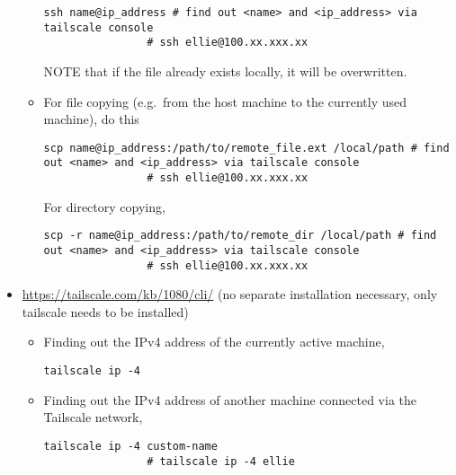 \documentclass[12pt, a4paper]{scrbook}
\numberwithin{equation}{section}
\theoremstyle{definition}
\theoremstyle{definition}
\begin{document}
\begin{itemize}
\begin{itemize}
			\begin{lstlisting}[style=mystylepython, label=alg:tailscale_connec, xleftmargin=\parindent]
				ssh name@ip_address # find out <name> and <ip_address> via tailscale console
				# ssh ellie@100.xx.xxx.xx
			\end{lstlisting}
		
			NOTE that if the file already exists locally, it will be overwritten.
			
			\item For file copying (e.g.~from the host machine to the currently used machine), do this
			
			\begin{lstlisting}[style=mystylepython, label=alg:tailscale__scp_file, xleftmargin=\parindent]
				scp name@ip_address:/path/to/remote_file.ext /local/path # find out <name> and <ip_address> via tailscale console
				# ssh ellie@100.xx.xxx.xx
			\end{lstlisting}
			
			For directory copying, 
			
			\begin{lstlisting}[style=mystylepython, label=alg:tailscale__scp_dir, xleftmargin=\parindent]
				scp -r name@ip_address:/path/to/remote_dir /local/path # find out <name> and <ip_address> via tailscale console
				# ssh ellie@100.xx.xxx.xx
			\end{lstlisting}
			
		\end{itemize}
	
		\item \url{https://tailscale.com/kb/1080/cli/} (no separate installation necessary, only tailscale needs to be installed)
		
		\begin{itemize}
			\item Finding out the IPv4 address of the currently active machine,
			
			\begin{lstlisting}[style=mystylepython, label=alg:tailscale_ip, xleftmargin=\parindent]
				tailscale ip -4 
			\end{lstlisting}
			
			\item Finding out the IPv4 address of another machine connected via the Tailscale network,
			
			\begin{lstlisting}[style=mystylepython, label=alg:tailscale_ip, xleftmargin=\parindent]
				tailscale ip -4 custom-name
				# tailscale ip -4 ellie
			\end{lstlisting}
			

\end{itemize}
\end{itemize}
\end{document}
